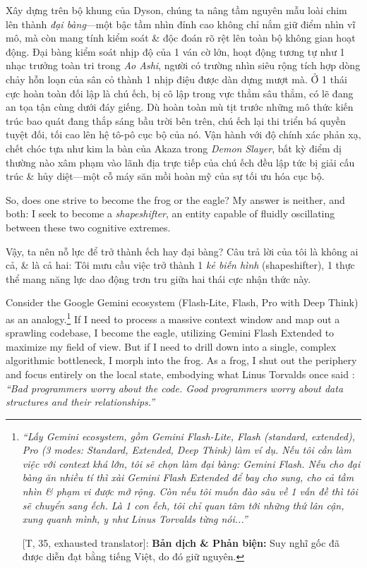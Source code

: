 \documentclass{article}
\begin{document}
Xây dựng trên bộ khung của Dyson, chúng ta nâng tầm nguyên mẫu loài chim lên thành \textit{đại bàng}---một bậc tầm nhìn đỉnh cao không chỉ nắm giữ điểm nhìn vĩ mô, mà còn mang tính kiểm soát \& độc đoán rõ rệt lên toàn bộ không gian hoạt động. Đại bàng kiểm soát nhịp độ của 1 ván cờ lớn, hoạt động tương tự như 1 nhạc trưởng toàn tri trong \textit{Ao Ashi}, người có trường nhìn siêu rộng tích hợp dòng chảy hỗn loạn của sân cỏ thành 1 nhịp điệu được dàn dựng mượt mà. Ở 1 thái cực hoàn toàn đối lập là chú ếch, bị cô lập trong vực thẳm sâu thẳm, có lẽ đang an tọa tận cùng dưới đáy giếng. Dù hoàn toàn mù tịt trước những mô thức kiến trúc bao quát đang thắp sáng bầu trời bên trên, chú ếch lại thi triển bá quyền tuyệt đối, tối cao lên hệ tô-pô cục bộ của nó. Vận hành với độ chính xác phản xạ, chết chóc tựa như kim la bàn của Akaza trong \textit{Demon Slayer}, bất kỳ điểm dị thường nào xâm phạm vào lãnh địa trực tiếp của chú ếch đều lập tức bị giải cấu trúc \& hủy diệt---một cỗ máy săn mồi hoàn mỹ của sự tối ưu hóa cục bộ.

So, does one strive to become the frog or the eagle? My answer is neither, and both: I seek to become a \textit{shapeshifter}, an entity capable of fluidly oscillating between these two cognitive extremes.

Vậy, ta nên nỗ lực để trở thành ếch hay đại bàng? Câu trả lời của tôi là không ai cả, \& là cả hai: Tôi mưu cầu việc trở thành 1 \textit{kẻ biến hình} (shapeshifter), 1 thực thể mang năng lực dao động trơn tru giữa hai thái cực nhận thức này.

Consider the Google Gemini ecosystem (Flash-Lite, Flash, Pro with Deep Think) as an analogy.\footnote{\textit{``Lấy Gemini ecosystem, gồm Gemini Flash-Lite, Flash (standard, extended), Pro (3 modes: Standard, Extended, Deep Think) làm ví dụ. Nếu tôi cần làm việc với context khá lớn, tôi sẽ chọn làm đại bàng: Gemini Flash. Nếu cho đại bàng ăn nhiều tí thì xài Gemini Flash Extended để bay cho sung, cho cả tầm nhìn \& phạm vi được mở rộng. Còn nếu tôi muốn đào sâu về 1 vấn đề thì tôi sẽ chuyển sang ếch. Là 1 con ếch, tôi chỉ quan tâm tới những thứ lân cận, xung quanh mình, y như Linus Torvalds từng nói...''}
	
	\textsf{[T, 35, exhausted translator]:} \textbf{Bản dịch \& Phản biện:} Suy nghĩ gốc đã được diễn đạt bằng tiếng Việt, do đó giữ nguyên.} If I need to process a massive context window and map out a sprawling codebase, I become the eagle, utilizing Gemini Flash Extended to maximize my field of view. But if I need to drill down into a single, complex algorithmic bottleneck, I morph into the frog. As a frog, I shut out the periphery and focus entirely on the local state, embodying what Linus Torvalds once said \cite{torvalds2006good}: \textit{``Bad programmers worry about the code. Good programmers worry about data structures and their relationships.''}
\end{document}
